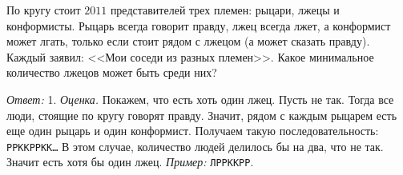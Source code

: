 По кругу стоит $2011$ представителей трех племен: рыцари, лжецы и конформисты.
Рыцарь всегда говорит правду, лжец всегда лжет, а конформист может лгать,
только если стоит рядом с лжецом (а может сказать правду).
Каждый заявил: <<Мои соседи из разных племен>>.
Какое минимальное количество лжецов может быть среди них?

\solution
\emph{Ответ:} 1.
\emph{Оценка.}
Покажем, что есть хоть один лжец.
Пусть не так.
Тогда все люди, стоящие по кругу говорят правду.
Значит, рядом с каждым рыцарем есть еще один рыцарь и один конформист.
Получаем такую последовательность: \texttt{РРККРРКК\ldots}
В этом случае, количество людей делилось бы на два, что не так.
Значит есть хотя бы один лжец.
\emph{Пример:} \texttt{ЛРРККРР}.

